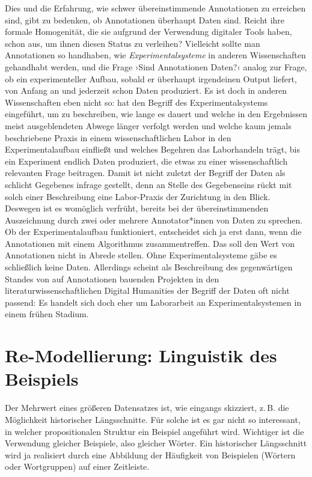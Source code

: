 \documentclass{article}
\begin{document}
Dies und die Erfahrung, wie schwer übereinstimmende Annotationen zu
erreichen sind, gibt zu bedenken, ob Annotationen überhaupt Daten
sind. Reicht ihre formale Homogenität, die sie aufgrund der Verwendung
digitaler Tools haben, schon aus, um ihnen diesen Status zu
verleihen? %
Vielleicht sollte man Annotationen so handhaben, wie
\emph{Experimentalsysteme} in anderen Wissenschaften gehandhabt
werden, und die Frage ›Sind Annotationen Daten?‹ analog zur Frage, ob
ein experimenteller Aufbau, sobald er überhaupt irgendeinen Output
liefert, von Anfang an und jederzeit schon Daten produziert. Es ist
doch in anderen Wissenschaften eben nicht so:
\textcite{Rheinberger2001a} hat den Begriff des Experimentalsystems
eingeführt, um zu beschreiben, wie lange es dauert und welche in den
Ergebnissen meist ausgeblendeten Abwege länger verfolgt werden und
welche kaum jemals beschriebene Praxis in einem wissenschaftlichen
Labor in den Experimentalaufbau einfließt und welches Begehren das
Laborhandeln trägt, bis ein Experiment endlich Daten produziert, die
etwas zu einer wissenschaftlich relevanten Frage beitragen. Damit ist
nicht zuletzt der Begriff der Daten als schlicht Gegebenes infrage
gestellt, denn an Stelle des Gegebenseins rückt mit solch einer
Beschreibung eine Labor-Praxis der Zurichtung in den Blick. Deswegen
ist es womöglich verfrüht, bereits bei der übereinstimmenden
Auszeichnung durch zwei oder mehrere Annotator*innen von Daten zu
sprechen. Ob der Experimentalaufbau funktioniert, entscheidet sich ja
erst dann, wenn die Annotationen mit einem Algorithmus
zusammentreffen. Das soll den Wert von Annotationen nicht in Abrede
stellen. Ohne Experimentalsysteme gäbe es schließlich keine
Daten. Allerdings scheint als Beschreibung des gegenwärtigen Standes
von auf Annotationen bauenden Projekten in den
literaturwissenschaftlichen Digital Humanities der Begriff der Daten
oft nicht passend: Es handelt sich doch eher um Laborarbeit an
Experimentalsystemen in einem frühen Stadium.

\section{Re-Modellierung: Linguistik des Beispiels}

Der Mehrwert eines größeren Datensatzes ist, wie eingangs skizziert,
z.\,B. die Möglichkeit historischer Längsschnitte. Für solche ist es
gar nicht so interessant, in welcher propositionalen Struktur ein
Beispiel angeführt wird. Wichtiger ist die Verwendung gleicher
Beispiele, also gleicher Wörter. Ein historischer Längsschnitt wird ja
realisiert durch eine Abbildung der Häufigkeit von Beispielen (Wörtern
oder Wortgruppen) auf einer Zeitleiste.
\end{document}
